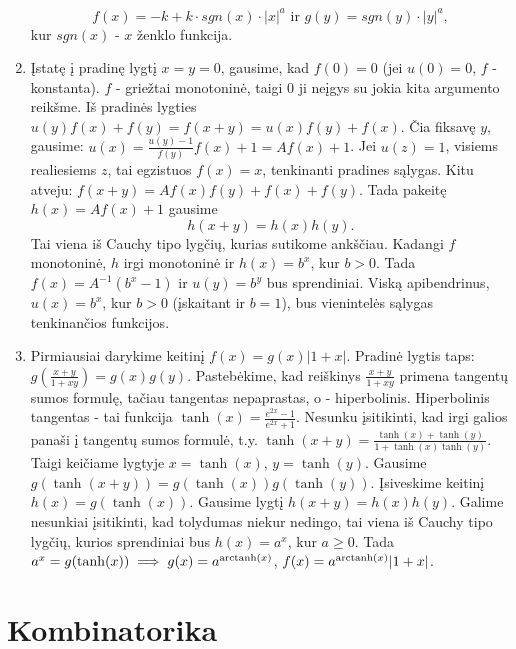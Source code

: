 \begin{enumerate}
$$f(x)=-k+k\cdot sgn(x)\cdot |x|^a \text{ ir } g(y)=sgn(y)\cdot |y|^a,$$
kur $sgn(x)$ - $x$ ženklo funkcija.
\item 
Įstatę į pradinę lygtį $x=y=0$, gausime, kad $f(0)=0$ (jei $u(0)=0$,
$f$ - konstanta). $f$ - griežtai monotoninė, taigi $0$ ji neįgys su
jokia kita argumento reikšme. Iš pradinės lygties
$u(y)f(x)+f(y)=f(x+y)=u(x)f(y)+f(x)$. Čia fiksavę $y$, gausime:
$u(x)=\frac{u(y)-1}{f(y)}f(x)+1=Af(x)+1$. Jei $u(z)=1$, visiems
realiesiems $z$, tai egzistuos $f(x)=x$, tenkinanti pradines sąlygas.
Kitu atveju: $f(x+y)=Af(x)f(y)+f(x)+f(y)$. Tada pakeitę $h(x)=Af(x)+1$
gausime $$h(x+y)=h(x)h(y).$$ Tai viena iš Cauchy tipo lygčių, kurias
sutikome ankščiau. Kadangi $f$ monotoninė, $h$ irgi monotoninė ir
$h(x)=b^x$, kur $b>0$. Tada $f(x)=A^{-1}(b^x-1)$ ir $u(y)=b^y$ bus
sprendiniai. Viską apibendrinus, $u(x)=b^x$, kur $b>0$ (įskaitant ir
$b=1$), bus vienintelės sąlygas tenkinančios funkcijos.
\item 
Pirmiausiai darykime keitinį $f(x)=g(x)|1+x|$. Pradinė lygtis taps:
$g(\frac{x+y}{1+xy})=g(x)g(y)$. Pastebėkime, kad reiškinys
$\frac{x+y}{1+xy}$ primena tangentų sumos formulę, tačiau tangentas
nepaprastas, o - hiperbolinis. Hiperbolinis tangentas - tai funkcija
$\tanh (x)=\frac{e^{2x}-1}{e^{2x}+1}$. Nesunku įsitikinti, kad irgi
galios panaši į tangentų sumos formulė, t.y. $\tanh(x+y)=\frac{\tanh
(x)+\tanh (y)}{1+\tanh (x) \tanh (y)}$. Taigi keičiame lygtyje
$x=\tanh(x)$, $y=\tanh(y)$. Gausime $g(\tanh(x+y))=g(\tanh(x))g(\tanh(y))$.
Įsiveskime keitinį $h(x)=g(\tanh(x))$. Gausime lygtį $h(x+y)=h(x)h(y)$.
Galime nesunkiai įsitikinti, kad tolydumas niekur nedingo, tai viena
iš Cauchy tipo lygčių, kurios sprendiniai bus $h(x)=a^{x}$, kur $a\geq
0$. Tada $a^{x}=g(\tanh(x))\implies g(x)=a^{\operatorname{arctanh}(x)}$,
$f(x)=a^{\operatorname{arctanh}(x)}|1+x|$.
\end{enumerate} 
\section*{Kombinatorika}

